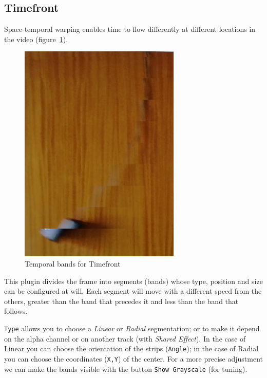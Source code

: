 \subsection{Timefront}%
\label{sub:timefront}

Space-temporal warping enables time to flow differently at different locations in the video (figure~\ref{fig:timefront}).
\begin{figure} 
    \vspace{-4ex}
    \includegraphics[width=0.8\linewidth]{images/timefront.png}
    \caption{Temporal bands for Timefront}
    \label{fig:timefront}
\end{figure}
This plugin divides the frame into segments (bands) whose type, position and size can be configured at will. Each segment will move with a different speed from the others, greater than the band that precedes it and less than the band that follows.

\texttt{Type} allows you to choose a \textit{Linear} or \textit{Radial} segmentation; or to make it depend on the alpha channel or on another track (with \textit{Shared Effect}). In the case of Linear you can choose the orientation of the strips (\texttt{Angle}); in the case of Radial you can choose the coordinates (\texttt{X,Y}) of the center. For a more precise adjustment we can make the bands visible with the button \texttt{Show Grayscale} (for tuning).

